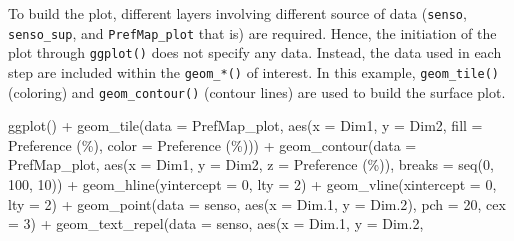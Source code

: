 \documentclass[
]{krantz}
\makeatletter
\newenvironment{Shaded}{\begin{snugshade}}{\end{snugshade}}
\newcommand{\AttributeTok}[1]{\textcolor[rgb]{0.61,0.61,0.61}{#1}}
\newcommand{\DecValTok}[1]{\textcolor[rgb]{0.06,0.06,0.06}{#1}}
\newcommand{\FloatTok}[1]{\textcolor[rgb]{0.06,0.06,0.06}{#1}}
\newcommand{\FunctionTok}[1]{\textcolor[rgb]{0,0,0}{#1}}
\newcommand{\NormalTok}[1]{#1}
\newcommand{\SpecialCharTok}[1]{\textcolor[rgb]{0,0,0}{#1}}
\newcommand{\StringTok}[1]{\textcolor[rgb]{0.5,0.5,0.5}{#1}}
\newenvironment{kframe}{%
\medskip{}
\setlength{\fboxsep}{.8em}
 \def\at@end@of@kframe{}%
 \ifinner\ifhmode%
  \def\at@end@of@kframe{\end{minipage}}%
  \begin{minipage}{\columnwidth}%
 \fi\fi%
 \def\FrameCommand##1{\hskip\@totalleftmargin \hskip-\fboxsep
 \colorbox{shadecolor}{##1}\hskip-\fboxsep
     \hskip-\linewidth \hskip-\@totalleftmargin \hskip\columnwidth}%
 \MakeFramed {\advance\hsize-\width
   \@totalleftmargin\z@ \linewidth\hsize
   \@setminipage}}%
 {\par\unskip\endMakeFramed%
 \at@end@of@kframe}
\renewenvironment{Shaded}{\begin{kframe}}{\end{kframe}}
\makeatother
\begin{document}
To build the plot, different layers involving different source of data (\texttt{senso}, \texttt{senso\_sup}, and \texttt{PrefMap\_plot} that is) are required. Hence, the initiation of the plot through \texttt{ggplot()} does not specify any data. Instead, the data used in each step are included within the \texttt{geom\_*()} of interest. In this example, \texttt{geom\_tile()} (coloring) and \texttt{geom\_contour()} (contour lines) are used to build the surface plot.

\begin{Shaded}
\begin{Highlighting}[]
\FunctionTok{ggplot}\NormalTok{() }\SpecialCharTok{+}
  \FunctionTok{geom\_tile}\NormalTok{(}\AttributeTok{data =}\NormalTok{ PrefMap\_plot, }\FunctionTok{aes}\NormalTok{(}\AttributeTok{x =}\NormalTok{ Dim1, }\AttributeTok{y =}\NormalTok{ Dim2, }
                                     \AttributeTok{fill =} \StringTok{\textasciigrave{}}\AttributeTok{Preference (\%)}\StringTok{\textasciigrave{}}\NormalTok{, }
                                     \AttributeTok{color =} \StringTok{\textasciigrave{}}\AttributeTok{Preference (\%)}\StringTok{\textasciigrave{}}\NormalTok{)) }\SpecialCharTok{+}
  \FunctionTok{geom\_contour}\NormalTok{(}\AttributeTok{data =}\NormalTok{ PrefMap\_plot, }\FunctionTok{aes}\NormalTok{(}\AttributeTok{x =}\NormalTok{ Dim1, }\AttributeTok{y =}\NormalTok{ Dim2, }
                                        \AttributeTok{z =} \StringTok{\textasciigrave{}}\AttributeTok{Preference (\%)}\StringTok{\textasciigrave{}}\NormalTok{), }
               \AttributeTok{breaks =} \FunctionTok{seq}\NormalTok{(}\DecValTok{0}\NormalTok{, }\DecValTok{100}\NormalTok{, }\DecValTok{10}\NormalTok{)) }\SpecialCharTok{+}
  \FunctionTok{geom\_hline}\NormalTok{(}\AttributeTok{yintercept =} \DecValTok{0}\NormalTok{, }\AttributeTok{lty =} \DecValTok{2}\NormalTok{) }\SpecialCharTok{+}
  \FunctionTok{geom\_vline}\NormalTok{(}\AttributeTok{xintercept =} \DecValTok{0}\NormalTok{, }\AttributeTok{lty =} \DecValTok{2}\NormalTok{) }\SpecialCharTok{+}
  \FunctionTok{geom\_point}\NormalTok{(}\AttributeTok{data =}\NormalTok{ senso, }\FunctionTok{aes}\NormalTok{(}\AttributeTok{x =}\NormalTok{ Dim}\FloatTok{.1}\NormalTok{, }\AttributeTok{y =}\NormalTok{ Dim}\FloatTok{.2}\NormalTok{), }
             \AttributeTok{pch =} \DecValTok{20}\NormalTok{, }\AttributeTok{cex =} \DecValTok{3}\NormalTok{) }\SpecialCharTok{+}
  \FunctionTok{geom\_text\_repel}\NormalTok{(}\AttributeTok{data =}\NormalTok{ senso, }\FunctionTok{aes}\NormalTok{(}\AttributeTok{x =}\NormalTok{ Dim}\FloatTok{.1}\NormalTok{, }\AttributeTok{y =}\NormalTok{ Dim}\FloatTok{.2}\NormalTok{, }

\end{Highlighting}
\end{Shaded}
\end{document}
